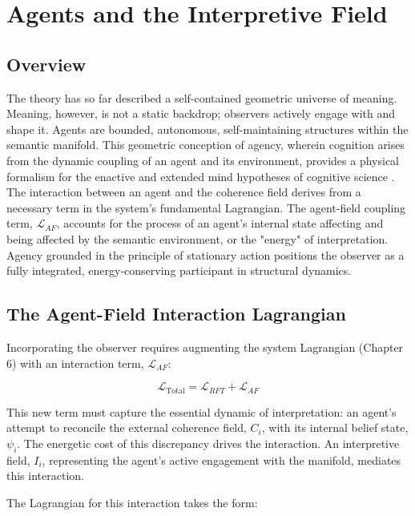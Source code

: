 \chapter{Agents and the Interpretive Field}

\section{Overview}

The theory has so far described a self-contained geometric universe of meaning. Meaning, however, is not a static backdrop; observers actively engage with and shape it. Agents are bounded, autonomous, self-maintaining structures within the semantic manifold. This geometric conception of agency, wherein cognition arises from the dynamic coupling of an agent and its environment, provides a physical formalism for the enactive and extended mind hypotheses of cognitive science \autocite{VarelaThompsonRosch1991, ClarkChalmers1998}. The interaction between an agent and the coherence field derives from a necessary term in the system's fundamental Lagrangian. The agent-field coupling term, \(\mathcal{L}_{AF}\), accounts for the process of an agent's internal state affecting and being affected by the semantic environment, or the "energy" of interpretation. Agency grounded in the principle of stationary action positions the observer as a fully integrated, energy-conserving participant in structural dynamics.

\section{The Agent-Field Interaction Lagrangian}

Incorporating the observer requires augmenting the system Lagrangian (Chapter 6) with an interaction term, \(\mathcal{L}_{AF}\):

\begin{equation}
\mathcal{L}_{\text{Total}} = \mathcal{L}_{RFT} + \mathcal{L}_{AF}
\end{equation}

This new term must capture the essential dynamic of interpretation: an agent's attempt to reconcile the external coherence field, \(C_i\), with its internal belief state, \(\psi_i\). The energetic cost of this discrepancy drives the interaction. An interpretive field, \(I_i\), representing the agent's active engagement with the manifold, mediates this interaction.

The Lagrangian for this interaction takes the form:

